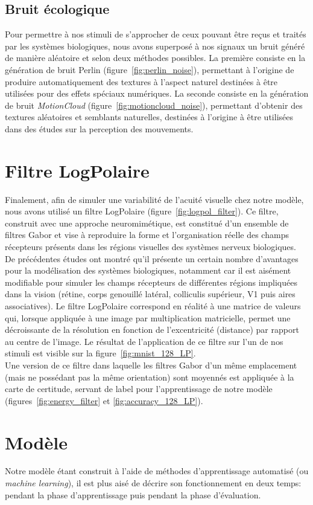 \subsection{Bruit écologique}
Pour permettre à nos stimuli de s'approcher de ceux pouvant être reçus et traités par les systèmes biologiques, nous avons superposé à nos signaux un bruit généré de manière aléatoire et selon deux méthodes possibles.
La première consiste en la génération de bruit Perlin \autocite{Perlin1985} (figure~\ref{fig:perlin_noise}), permettant à l'origine de produire automatiquement des textures à l'aspect naturel destinées à être utilisées pour des effets spéciaux numériques.
La seconde consiste en la génération de bruit \textit{MotionCloud} (figure~\ref{fig:motioncloud_noise}), permettant d'obtenir des textures aléatoires et semblants naturelles, destinées à l'origine à être utilisées dans des études sur la perception des mouvements. \autocite{Leon2012}

\section{Filtre LogPolaire}
Finalement, afin de simuler une variabilité de l'acuité visuelle chez notre modèle, nous avons utilisé un filtre LogPolaire (figure~\ref{fig:logpol_filter}).
Ce filtre, construit avec une approche neuromimétique, est constitué d'un ensemble de filtres Gabor et vise à reproduire la forme et l'organisation réelle des champs récepteurs présents dans les régions visuelles des systèmes nerveux biologiques. 
De précédentes études ont montré qu'il présente un certain nombre d'avantages pour la modélisation des systèmes biologiques, notamment car il est aisément modifiable pour simuler les champs récepteurs de différentes régions impliquées dans la vision (rétine, corps genouillé latéral, colliculis supérieur, V1 puis aires associatives).
Le filtre LogPolaire correspond en réalité à une matrice de valeurs qui, lorsque appliquée à une image par multiplication matricielle, permet une décroissante de la résolution en fonction de l'excentricité (distance) par rapport au centre de l'image. 
Le résultat de l'application de ce filtre sur l'un de nos stimuli est visible sur la figure~\ref{fig:mnist_128_LP}. \autocite{Freeman2011} \\
Une version de ce filtre dans laquelle les filtres Gabor d'un même emplacement (mais ne possédant pas la même orientation) sont moyennés est appliquée à la carte de certitude, servant de label pour l'apprentissage de notre modèle (figures~\ref{fig:energy_filter} et \ref{fig:accuracy_128_LP}). \\

\section{Modèle}
Notre modèle étant construit à l'aide de méthodes d'apprentissage automatisé (ou \textit{machine learning}), il est plus aisé de décrire son fonctionnement en deux temps: pendant la phase d'apprentissage puis pendant la phase d'évaluation. \\



